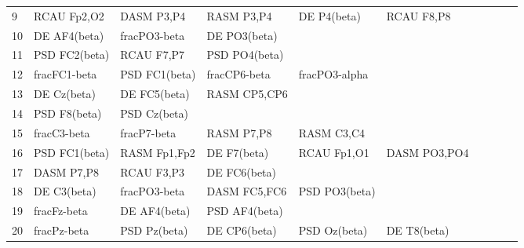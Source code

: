 \begin{landscape}
\begin{table}[]
\begin{tabular}{l|llllllll}
9        & RCAU Fp2,O2    & DASM P3,P4     & RASM P3,P4     & DE P4(beta)    & RCAU F8,P8     &                &                &                &               &              \\
10       & DE AF4(beta)   & fracPO3-beta   & DE PO3(beta)   &                &                &                &                &                &               &              \\
11       & PSD FC2(beta)  & RCAU F7,P7     & PSD PO4(beta)  &                &                &                &                &                &               &              \\
12       & fracFC1-beta   & PSD FC1(beta)  & fracCP6-beta   & fracPO3-alpha  &                &                &                &                &               &              \\
13       & DE Cz(beta)    & DE FC5(beta)   & RASM CP5,CP6   &                &                &                &                &                &               &              \\
14       & PSD F8(beta)   & PSD Cz(beta)   &                &                &                &                &                &                &               &              \\
15       & fracC3-beta    & fracP7-beta    & RASM P7,P8     & RASM C3,C4     &                &                &                &                &               &              \\
16       & PSD FC1(beta)  & RASM Fp1,Fp2   & DE F7(beta)    & RCAU Fp1,O1    & DASM PO3,PO4   &                &                &                &               &              \\
17       & DASM P7,P8     & RCAU F3,P3     & DE FC6(beta)   &                &                &                &                &                &               &              \\
18       & DE C3(beta)    & fracPO3-beta   & DASM FC5,FC6   & PSD PO3(beta)  &                &                &                &                &               &              \\
19       & fracFz-beta    & DE AF4(beta)   & PSD AF4(beta)  &                &                &                &                &                &               &              \\
20       & fracPz-beta    & PSD Pz(beta)   & DE CP6(beta)   & PSD Oz(beta)   & DE T8(beta)    &                &                &                &               &              \\

\end{tabular}
\end{table}
\end{landscape}
